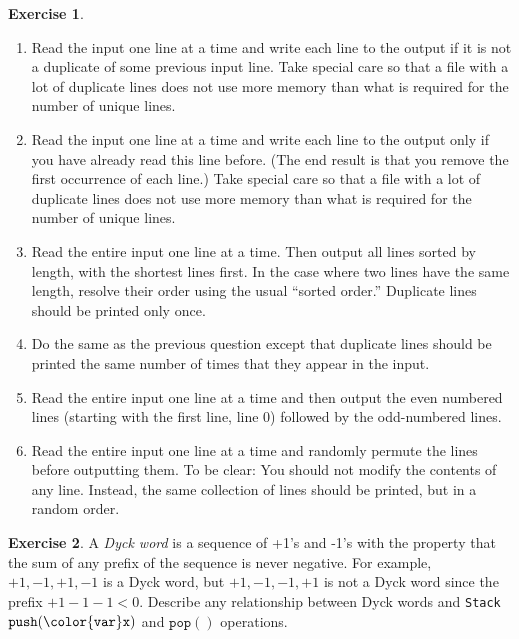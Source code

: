 \documentclass[10pt]{book}
\theoremstyle{plain}
\theoremstyle{definition}
\newtheorem{exc}{Exercise}[chapter]
\begin{document}
\begin{exc}
\begin{enumerate}
    \item Read the input one line at a time and write each line to the
      output if it is not a duplicate of some previous input line. Take
      special care so that a file with a lot of duplicate lines does not
      use more memory than what is required for the number of unique lines.

    \item Read the input one line at a time and write each line to the
      output only if you have already read this line before. (The end
      result is that you remove the first occurrence of each line.)
      Take special care so that a file with a lot of duplicate lines
      does not use more memory than what is required for the number of
      unique lines.

    \item Read the entire input one line at a time. Then output all lines
      sorted by length, with the shortest lines first. In the case where
      two lines have the same length, resolve their order using the usual
      ``sorted order.''  Duplicate lines should be printed only once.

    \item Do the same as the previous question except that duplicate lines
      should be printed the same number of times that they appear in the input.

    \item Read the entire input one line at a time and then output the
      even numbered lines (starting with the first line, line 0) followed
      by the odd-numbered lines.

    \item Read the entire input one line at a time and randomly permute
      the lines before outputting them.  To be clear: You should not
      modify the contents of any line. Instead, the same collection of
      lines should be printed, but in a random order.
  \end{enumerate}
\end{exc}

\begin{exc}
  A \emph{Dyck word} is a sequence of +1's and -1's with the property that
  the sum of any prefix of the sequence is never negative.  For example,
  $+1,-1,+1,-1$ is a Dyck word, but $+1,-1,-1,+1$ is not a Dyck word
  since the prefix $+1-1-1<0$.  Describe any relationship
  between Dyck words and \texttt{Stack} \ensuremath{\mathtt{push({\color{var}x})}} and \ensuremath{\mathtt{pop()}} operations.
\end{exc}
\end{document}
